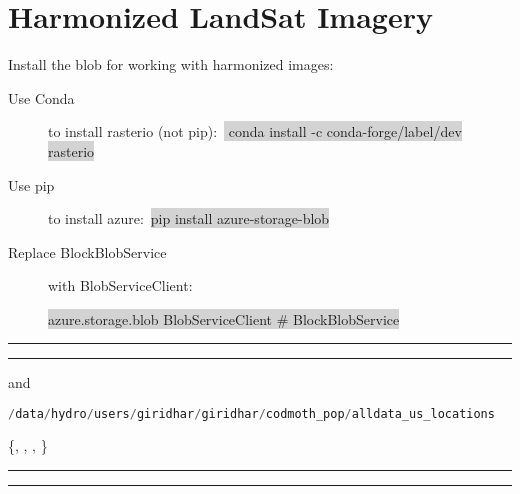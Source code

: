 \section{Harmonized LandSat Imagery}

Install the blob for working with harmonized images:

\begin{description}

\item [Use Conda] to install rasterio (not pip):~{\scriptsize{\colorbox{lightgray}{ conda install -c conda-forge/label/dev rasterio}}}

\item [Use pip] to install azure:~{\scriptsize{\colorbox{lightgray}{pip install azure-storage-blob}}}

\item [Replace BlockBlobService]  with BlobServiceClient:

{\scriptsize{\colorbox{lightgray}{{\color{Green}{from}} azure.storage.blob {\color{Green}{import}} BlobServiceClient \# BlockBlobService }}}



\end{description}

\hrule
\hrule
{} and 

{\scriptsize \begin{lstlisting}[backgroundcolor = \color{lightgray},
                   language = C,
                   xleftmargin = .5cm,
                   xrightmargin = 1.2cm,
                   framexleftmargin = .05cm]
/data/hydro/users/giridhar/giridhar/codmoth_pop/alldata_us_locations
\end{lstlisting}}

\{, , , \} 	
\hrule
\hrule


